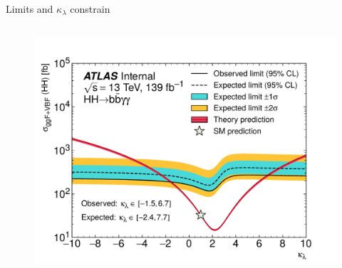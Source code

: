 \begin{frame}{Limits and $\kappa_{\lambda}$ constrain}
\begin{columns}

\begin{figure}
    \centering
    \includegraphics[width=1.1\textwidth]{Part3/Img/figures_Results_kappa_lambda_scan.pdf}
\end{figure}



\end{columns}
\end{frame}
